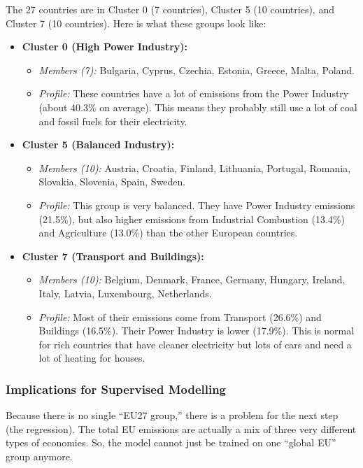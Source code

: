 \documentclass[11pt,a4paper]{article}
\begin{document}
The 27 countries are in Cluster 0 (7 countries), Cluster 5 (10 countries), and Cluster 7 (10 countries). Here is what these groups look like:

\begin{itemize}
    \item \textbf{Cluster 0 (High Power Industry):}
    \begin{itemize}
        \item \textit{Members (7):} Bulgaria, Cyprus, Czechia, Estonia, Greece, Malta, Poland.
        \item \textit{Profile:} These countries have a lot of emissions from the Power Industry (about 40.3\% on average). This means they probably still use a lot of coal and fossil fuels for their electricity.
    \end{itemize}
    
    \item \textbf{Cluster 5 (Balanced Industry):}
    \begin{itemize}
        \item \textit{Members (10):} Austria, Croatia, Finland, Lithuania, Portugal, Romania, Slovakia, Slovenia, Spain, Sweden.
        \item \textit{Profile:} This group is very balanced. They have Power Industry emissions (21.5\%), but also higher emissions from Industrial Combustion (13.4\%) and Agriculture (13.0\%) than the other European countries.
    \end{itemize}
    
    \item \textbf{Cluster 7 (Transport and Buildings):}
    \begin{itemize}
        \item \textit{Members (10):} Belgium, Denmark, France, Germany, Hungary, Ireland, Italy, Latvia, Luxembourg, Netherlands.
        \item \textit{Profile:} Most of their emissions come from Transport (26.6\%) and Buildings (16.5\%). Their Power Industry is lower (17.9\%). This is normal for rich countries that have cleaner electricity but lots of cars and need a lot of heating for houses.
    \end{itemize}
\end{itemize}

\subsubsection{Implications for Supervised Modelling}
Because there is no single ``EU27 group,'' there is a problem for the next step (the regression). The total EU emissions are actually a mix of three very different types of economies. So, the model cannot just be trained on one ``global EU'' group anymore. 
\end{document}
